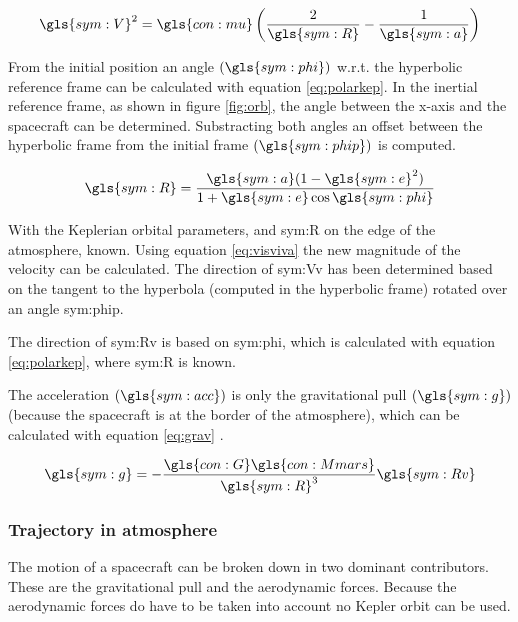 \begin{equation}
\gls{sym:V}^2 = \gls{con:mu}\left(\frac{2}{\gls{sym:R}}-\frac{1}{\gls{sym:a}}\right)
\label{eq:visviva}
\end{equation}

From the initial position an angle $\left (\gls{sym:phi}\right)$ w.r.t. the hyperbolic reference frame can be calculated with equation \ref{eq:polarkep}. In the inertial reference frame, as shown in figure \ref{fig:orb}, the angle between the x-axis and the spacecraft can be determined. Substracting both angles an offset between the hyperbolic frame from the initial frame $\left (\gls{sym:phip}\right)$ is computed.


\begin{equation}
\gls{sym:R} = \frac{\gls{sym:a}(1-\gls{sym:e}^2)}{1+\gls{sym:e}\cos{\gls{sym:phi}}}
\label{eq:polarkep}
\end{equation}

With the Keplerian orbital parameters, and \gls{sym:R} on the edge of the atmosphere, known. Using equation \ref{eq:visviva} the new magnitude of the velocity can be calculated. The direction of \gls{sym:Vv} has been determined based on the tangent to the hyperbola (computed in the hyperbolic frame) rotated over an angle \gls{sym:phip}.

The direction of \gls{sym:Rv} is based on \gls{sym:phi}, which is calculated with equation \ref{eq:polarkep}, where \gls{sym:R} is known.


The acceleration $\left(\gls{sym:acc}\right)$ is only the gravitational pull $\left(\gls{sym:g}\right)$ (because the spacecraft is at the border of the atmosphere), which can be calculated with equation \ref{eq:grav} \cite{Weiland2004}.


\begin{equation} \label{eq:grav}
\gls{sym:g} = -\frac{\gls{con:G}\gls{con:Mmars}}
					{\gls{sym:R}^3}\gls{sym:Rv}
\end{equation}

\subsubsection{Trajectory in atmosphere}
 \label{sec:trajatmos}

The motion of a spacecraft can be broken down in two dominant contributors. These are the gravitational pull and the aerodynamic forces. Because the aerodynamic forces do have to be taken into account no Kepler orbit can be used.

